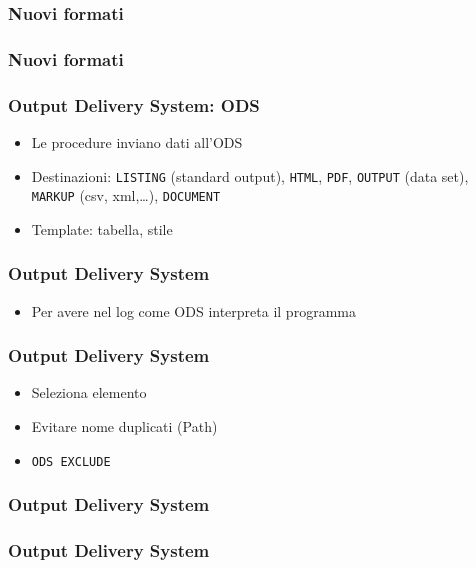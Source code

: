 \begin{frame}[containsverbatim]\frametitle{Nuovi formati}
\end{frame}


\begin{frame}[containsverbatim]\frametitle{Nuovi formati}
\end{frame}

\begin{frame}[containsverbatim]\frametitle{Output Delivery System: ODS}
  \begin{itemize}
  \item
    Le procedure inviano dati all'ODS
  \item
    Destinazioni: \verb+LISTING+ (standard output), \verb+HTML+, \verb+PDF+,
    \verb+OUTPUT+ (data set), \verb+MARKUP+ (csv, xml,\ldots), \verb+DOCUMENT+
  \item
    Template: tabella, stile
  \end{itemize}
\end{frame}


\begin{frame}[containsverbatim]\frametitle{Output Delivery System}
  \begin{itemize}
  \item
    Per avere nel log come ODS interpreta il programma
  \end{itemize}
\end{frame}


\begin{frame}[containsverbatim]\frametitle{Output Delivery System}
  \begin{itemize}
  \item
    Seleziona elemento
  \item
    Evitare nome duplicati (Path)
  \item
    \verb+ODS EXCLUDE+
  \end{itemize}
\end{frame}

\begin{frame}[containsverbatim]\frametitle{Output Delivery System}
\end{frame}


\begin{frame}[containsverbatim]\frametitle{Output Delivery System}
\end{frame}


